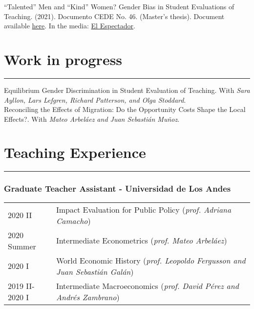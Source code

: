 \documentclass[12pt, letterpaper]{article}
\begin{document}
\noindent ``Talented'' Men and ``Kind'' Women? Gender Bias in Student Evaluations of Teaching. (2021). Documento CEDE No. 46. (Master's thesis). Document available \href{https://papers.ssrn.com/sol3/papers.cfm?abstract_id=3919797}{here}. In the media: \href{https://www.elespectador.com/educacion/los-profes-crack-y-las-profes-amables-el-sesgo-de-genero-en-las-aulas/}{El Espectador}.

\vspace{-5mm}

\section*{Work in progress}
\vspace*{-8mm}
\noindent \rule{\linewidth}{0.2mm}
\noindent Equilibrium Gender Discrimination in Student Evaluation of Teaching. With \textit{Sara Ayllon, Lars Lefgren, Richard Patterson, and Olga Stoddard}. \\ [-3mm]

\noindent Reconciling the Effects of Migration: Do the Opportunity Costs Shape the Local Effects?. With \textit{Mateo Arbeláez and Juan Sebastián Muñoz}. \\ [-3mm]

\vspace{-7mm}

\section*{Teaching Experience}
\vspace*{-8mm}
\noindent \rule{\linewidth}{0.2mm}
\vspace*{-12mm}
\subsubsection*{Graduate Teacher Assistant - Universidad de Los Andes}
\vspace*{-2mm}
\noindent
\begin{tabular}{@{}p{3cm}p{13.7cm}}
2020 II & Impact Evaluation for Public Policy (\textit{prof. Adriana Camacho}) \\
2020 Summer & Intermediate Econometrics (\textit{prof. Mateo Arbeláez}) \\
2020 I & World Economic History (\small{\textit{prof. Leopoldo Fergusson and Juan Sebastián Galán}}) \\
2019 II-2020 I & Intermediate Macroeconomics (\textit{prof. David Pérez and Andrés Zambrano}) 
\end{tabular}
\vspace*{-4mm}
\end{document}
